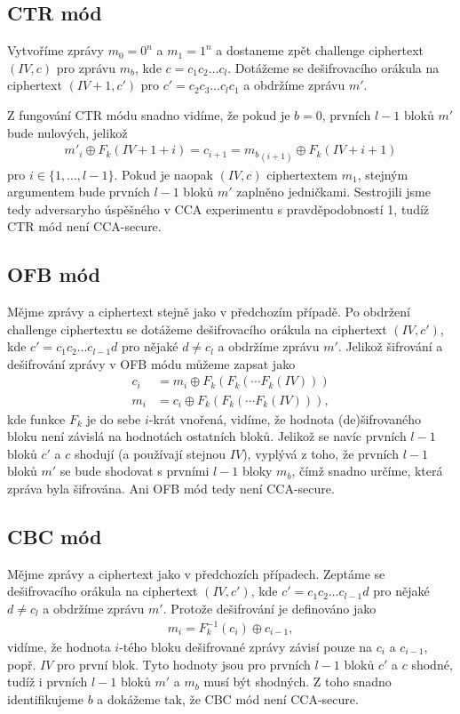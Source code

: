 \documentclass{scrartcl}
\DeclareMathOperator{\xor}{\oplus}
\begin{document}
    \subsection*{CTR mód}
    Vytvoříme zprávy $m_0 = 0^n$ a $m_1 = 1^n$ a dostaneme zpět challenge ciphertext $(IV,c)$ pro zprávu $m_b$, kde $c=c_1c_2\dots c_l$. Dotážeme se dešifrovacího orákula na ciphertext $(IV+1,c')$ pro $c'=c_2c_3\dots c_lc_1$ a obdržíme zprávu $m'$.

    Z fungování CTR módu snadno vidíme, že pokud je $b = 0$, prvních $l-1$ bloků $m'$ bude nulových, jelikož
    \begin{align*}
        m'_i \xor F_k(IV+1+i) = c_{i+1} = {m_b}_{(i+1)} \xor F_k(IV+i+1)
    \end{align*}
    pro $i \in \{1,\dots,l-1\}$. Pokud je naopak $(IV,c)$ ciphertextem $m_1$, stejným argumentem bude prvních $l-1$ bloků $m'$ zaplněno jedničkami. Sestrojili jsme tedy adversaryho úspěšného v CCA experimentu s pravděpodobností 1, tudíž CTR mód není CCA-secure.

    \subsection*{OFB mód}
    Mějme zprávy a ciphertext stejně jako v předchozím případě. Po obdržení challenge ciphertextu se dotážeme dešifrovacího orákula na ciphertext $(IV,c')$, kde $c' = c_1c_2\dots c_{l-1}d$ pro nějaké $d \neq c_l$ a obdržíme zprávu $m'$. Jelikož šifrování a dešifrování zprávy v OFB módu můžeme zapsat jako
    \begin{align*}
        c_i &= m_i \xor F_k(F_k(\cdots F_k(IV))) \\
        m_i &= c_i \xor F_k(F_k(\cdots F_k(IV))),
    \end{align*}
    kde funkce $F_k$ je do sebe $i$-krát vnořená, vidíme, že hodnota (de)šifrovaného bloku není závislá na hodnotách ostatních bloků. Jelikož se navíc prvních $l-1$ bloků $c'$ a $c$ shodují (a používají stejnou $IV$), vyplývá z toho, že prvních $l-1$ bloků $m'$ se bude shodovat s prvními $l-1$ bloky $m_b$, čímž snadno určíme, která zpráva byla šifrována. Ani OFB mód tedy není CCA-secure.

    \subsection*{CBC mód}
    Mějme zprávy a ciphertext jako v předchozích případech. Zeptáme se dešifrovacího orákula na ciphertext $(IV,c')$, kde $c' = c_1c_2\dots c_{l-1}d$ pro nějaké $d \neq c_l$ a obdržíme zprávu $m'$. Protože dešifrování je definováno jako
    \begin{align*}
        m_i = F_k^{-1}(c_i) \xor c_{i-1},
    \end{align*}
    vidíme, že hodnota $i$-tého bloku dešifrované zprávy závisí pouze na $c_i$ a $c_{i-1}$, popř. $IV$ pro první blok. Tyto hodnoty jsou pro prvních $l-1$ bloků $c'$ a $c$ shodné, tudíž i prvních $l-1$ bloků $m'$ a $m_b$ musí být shodných. Z toho snadno identifikujeme $b$ a dokážeme tak, že CBC mód není CCA-secure.
\end{document}
